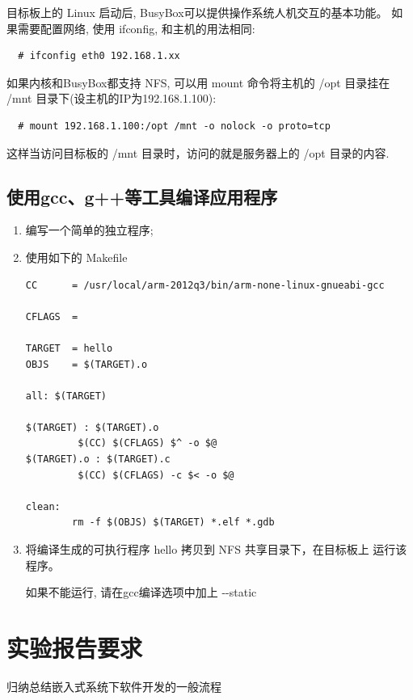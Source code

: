     目标板上的 Linux 启动后, BusyBox可以提供操作系统人机交互的基本功能。
如果需要配置网络, 使用 ifconfig, 和主机的用法相同:

\begin{boxedminipage}{.9\textwidth}
\begin{verbatim}
  # ifconfig eth0 192.168.1.xx
\end{verbatim}
\end{boxedminipage}

如果内核和BusyBox都支持 NFS, 可以用 mount 命令将主机的 /opt 目录挂在 /mnt 
目录下(设主机的IP为192.168.1.100):

\begin{boxedminipage}{.9\textwidth}
\begin{verbatim}
  # mount 192.168.1.100:/opt /mnt -o nolock -o proto=tcp
\end{verbatim}
\end{boxedminipage}

 这样当访问目标板的 /mnt 目录时，访问的就是服务器上的 /opt 目录的内容.

\subsection{使用gcc、g++等工具编译应用程序}
\begin{enumerate}
  \item 编写一个简单的独立程序;
  \item 使用如下的 Makefile

\lstset{language=make}
\begin{lstlisting}
CC      = /usr/local/arm-2012q3/bin/arm-none-linux-gnueabi-gcc

CFLAGS  =

TARGET  = hello
OBJS    = $(TARGET).o

all: $(TARGET)

$(TARGET) : $(TARGET).o
         $(CC) $(CFLAGS) $^ -o $@
$(TARGET).o : $(TARGET).c
         $(CC) $(CFLAGS) -c $< -o $@

clean:
        rm -f $(OBJS) $(TARGET) *.elf *.gdb
\end{lstlisting}

  \item 将编译生成的可执行程序 hello 拷贝到 NFS 共享目录下，在目标板上
		运行该程序。

		如果不能运行, 请在gcc编译选项中加上 -{}-static
\end{enumerate}

\section{实验报告要求}
    归纳总结嵌入式系统下软件开发的一般流程
